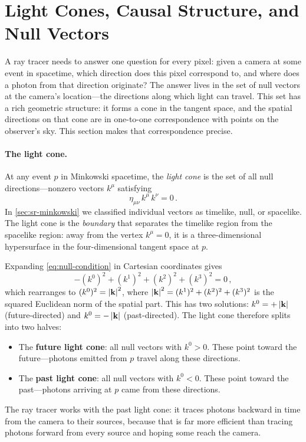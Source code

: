 \section{Light Cones, Causal Structure, and Null Vectors}
\label{sec:sr-causal}

A ray tracer needs to answer one question for every pixel: given a camera at
some event in spacetime, which direction does this pixel correspond to, and
where does a photon from that direction originate?  The answer lives in the set
of null vectors at the camera's location---the directions along which light can
travel.  This set has a rich geometric structure: it forms a cone in the tangent
space, and the spatial directions on that cone are in one-to-one correspondence
with points on the observer's sky.  This section makes that correspondence
precise.

\paragraph{The light cone.}

At any event $p$ in Minkowski spacetime, the \emph{light cone} is the set of
all null directions---nonzero vectors $k^\mu$ satisfying
%
\begin{equation}
  \eta_{\mu\nu}\, k^\mu\, k^\nu = 0 \,.
  \label{eq:null-condition}
\end{equation}
%
In \cref{sec:sr-minkowski} we classified individual vectors as timelike, null,
or spacelike.  The light cone is the \emph{boundary} that separates the
timelike region from the spacelike region: away from the vertex $k^\mu = 0$,
it is a three-dimensional hypersurface in the four-dimensional tangent space
at $p$.

Expanding \cref{eq:null-condition} in Cartesian coordinates gives
%
\begin{equation}
  -(k^0)^2 + (k^1)^2 + (k^2)^2 + (k^3)^2 = 0 \,,
  \label{eq:null-expanded}
\end{equation}
%
which rearranges to $(k^0)^2 = \left\lvert \mathbf{k} \right\rvert^2$, where $\left\lvert \mathbf{k} \right\rvert^2
= (k^1)^2 + (k^2)^2 + (k^3)^2$ is the squared Euclidean norm of the spatial
part.  This has two solutions: $k^0 = +\left\lvert \mathbf{k} \right\rvert$ (future-directed) and
$k^0 = -\left\lvert \mathbf{k} \right\rvert$ (past-directed).  The light cone therefore splits
into two halves:
%
\begin{itemize}
  \item The \textbf{future light cone}: all null vectors with $k^0 > 0$.
    These point toward the future---photons emitted from $p$ travel along
    these directions.
  \item The \textbf{past light cone}: all null vectors with $k^0 < 0$.
    These point toward the past---photons arriving at $p$ came from
    these directions.
\end{itemize}
%
The ray tracer works with the past light cone: it traces photons backward in
time from the camera to their sources, because that is far more efficient than
tracing photons forward from every source and hoping some reach the camera.

